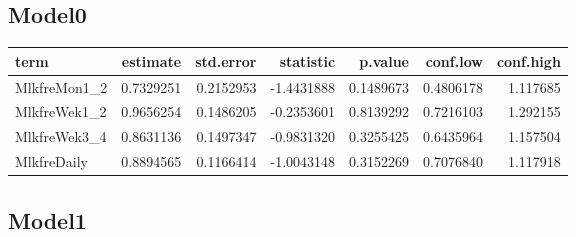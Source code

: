 \documentclass[
]{article}
\newenvironment{Shaded}{\begin{snugshade}}{\end{snugshade}}
\newcommand{\DataTypeTok}[1]{\textcolor[rgb]{0.13,0.29,0.53}{#1}}
\newcommand{\KeywordTok}[1]{\textcolor[rgb]{0.13,0.29,0.53}{\textbf{#1}}}
\newcommand{\NormalTok}[1]{#1}
\newcommand{\OperatorTok}[1]{\textcolor[rgb]{0.81,0.36,0.00}{\textbf{#1}}}
\newcommand{\OtherTok}[1]{\textcolor[rgb]{0.56,0.35,0.01}{#1}}
\newcommand{\StringTok}[1]{\textcolor[rgb]{0.31,0.60,0.02}{#1}}
\begin{document}
\hypertarget{model0-4}{%
\subsection{Model0}\label{model0-4}}

\begin{Shaded}
\end{Shaded}

\begin{longtable}[]{@{}lrrrrrr@{}}
\toprule
term & estimate & std.error & statistic & p.value & conf.low &
conf.high\tabularnewline
\midrule
\endhead
MlkfreMon1\_2 & 0.7329251 & 0.2152953 & -1.4431888 & 0.1489673 &
0.4806178 & 1.117685\tabularnewline
MlkfreWek1\_2 & 0.9656254 & 0.1486205 & -0.2353601 & 0.8139292 &
0.7216103 & 1.292155\tabularnewline
MlkfreWek3\_4 & 0.8631136 & 0.1497347 & -0.9831320 & 0.3255425 &
0.6435964 & 1.157504\tabularnewline
MlkfreDaily & 0.8894565 & 0.1166414 & -1.0043148 & 0.3152269 & 0.7076840
& 1.117918\tabularnewline
\bottomrule
\end{longtable}

\hypertarget{model1-4}{%
\subsection{Model1}\label{model1-4}}

\begin{Shaded}
\end{Shaded}
\end{document}
